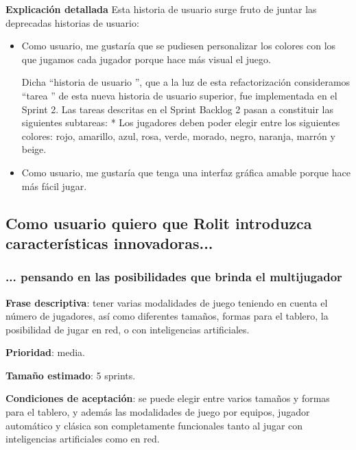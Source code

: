 \documentclass[../../FINAL/Scrum/SCRUM.tex]{subfiles}
\begin{document}
\textbf{Explicación detallada}
Esta historia de usuario surge fruto de juntar las deprecadas historias de usuario:
\begin{itemize}
\item  Como usuario, me gustaría que se pudiesen personalizar los colores con los que jugamos cada jugador porque hace más visual el juego. 

    Dicha  ``historia de usuario '', que a la luz de esta refactorización consideramos  ``tarea '' de esta nueva historia de usuario superior, fue implementada en el Sprint 2. Las tareas descritas en el Sprint Backlog 2 pasan a constituir las siguientes subtareas:
     * Los jugadores deben poder elegir entre los siguientes colores: rojo, amarillo, azul, rosa, verde, morado, negro, naranja, marrón y beige.

\item  Como usuario, me gustaría que tenga una interfaz gráfica amable porque hace más fácil jugar.
\end{itemize}

\subsection{Como usuario quiero que Rolit introduzca características innovadoras...}
\subsubsection{... pensando en las posibilidades que brinda el multijugador}
\textbf{Frase descriptiva}: tener varias modalidades de juego teniendo en cuenta el número de jugadores, así como diferentes tamaños, formas para el tablero, la posibilidad de jugar en red, o con inteligencias artificiales.

\textbf{Prioridad}: media.

\textbf{Tamaño estimado}: 5 sprints.

\textbf{Condiciones de aceptación}: se puede elegir entre varios tamaños y formas para el tablero, y además las modalidades de juego por equipos, jugador automático y clásica son completamente funcionales tanto al jugar con inteligencias artificiales como en red.
\end{document}
